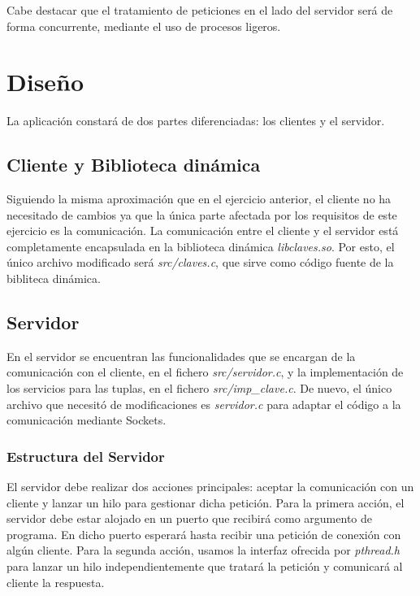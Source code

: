 \documentclass[]{article}
\begin{document}
Cabe destacar que el tratamiento de peticiones en el lado del servidor será de forma concurrente, mediante el uso de procesos ligeros. 

\section{Diseño}
\label{sec:disenno}
La aplicación constará de dos partes diferenciadas: los clientes y el servidor.

\subsection{Cliente y Biblioteca dinámica}
\label{subsec:cliente_biblioteca}
Siguiendo la misma aproximación que en el ejercicio anterior, el cliente no ha necesitado de cambios ya que la única parte afectada por los requisitos de este ejercicio es la comunicación. La comunicación entre el cliente y el servidor está completamente encapsulada en la biblioteca dinámica \textit{libclaves.so}. Por esto, el único archivo modificado será \textit{src/claves.c}, que sirve como código fuente de la bibliteca dinámica.


\subsection{Servidor}
\label{subsec:servidor}
En el servidor se encuentran las funcionalidades que se encargan de la comunicación con el cliente, en el fichero \textit{src/servidor.c}, y la implementación de los servicios para las tuplas, en el fichero \textit{src/imp\_clave.c}. De nuevo, el único archivo que necesitó de modificaciones es \textit{servidor.c} para adaptar el código a la comunicación mediante Sockets. 

\subsubsection{Estructura del Servidor}
\label{subsec::estructura_servidor}
El servidor debe realizar dos acciones principales: aceptar la comunicación con un cliente y lanzar un hilo para gestionar dicha petición. Para la primera acción, el servidor debe estar alojado en un puerto que recibirá como argumento de programa. En dicho puerto esperará hasta recibir una petición de conexión con algún cliente. Para la segunda acción, usamos la interfaz ofrecida por \textit{pthread.h} para lanzar un hilo independientemente que tratará la petición y comunicará al cliente la respuesta. 
\end{document}
